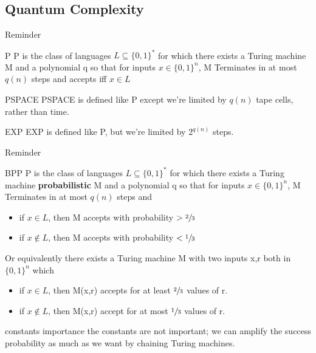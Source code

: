     \subsection {Quantum Complexity}
    \begin{frame}{Reminder}
        \begin{block}{P}
            P is the class of languages $L \subseteq \{0,1\}^*$ for which there exists a Turing machine M and a polynomial q
            so that for inputs $x \in \{0,1\}^n$, M Terminates in at most $q(n)$ steps and accepts iff $x \in L$
        \end{block}
        \pause
        \begin{block}{PSPACE}
            PSPACE is defined like P except we're limited by $q(n)$ tape cells, rather than time.
        \end{block}
        \pause
        \begin{block}{EXP}
            EXP is defined like P, but we're limited by $2^{q(n)}$ steps.
        \end{block}
        
    \end{frame}
    \begin{frame}{Reminder}
        \begin{block}{BPP}
            P is the class of languages $L \subseteq \{0,1\}^*$ for which there exists a Turing machine \textbf{probabilistic} M and a polynomial q
            so that for inputs $x \in \{0,1\}^n$, M Terminates in at most $q(n)$ steps and
            \begin{itemize}
                \item if $x \in L$, then M accepts with probability $> \sfrac{2}{3}$
                \item if $x \notin L$, then M accepts with probability $< \sfrac{1}{3}$
            \end{itemize}
            Or equivalently there exists a Turing machine M with two inputs x,r both in $\{0,1\}^n$
            which
            \begin{itemize}
                \item if $x \in L$, then M(x,r) accepts for at least $\sfrac{2}{3}$ values of r.
                \item if $x \notin L$, then M(x,r) accept for at most $\sfrac{1}{3}$ values of r.
            \end{itemize}
            \pause
            \begin{alertblock}{constants importance}
                the constants are not important; we can amplify the success probability as much as we want by chaining Turing machines.
            \end{alertblock}
        \end{block}
    \end{frame}
